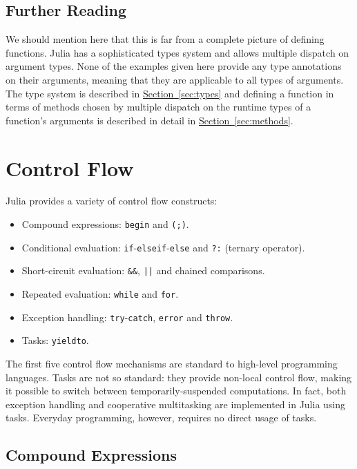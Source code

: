 \documentclass{article}
\renewcommand{\sec}[1]{\label{sec:#1}}
\newcommand{\Section}[1]{\hyperref[sec:#1]{Section~\ref*{sec:#1}}}
\begin{document}
\subsection{Further Reading}

We should mention here that this is far from a complete picture of defining functions.
Julia has a sophisticated types system and allows multiple dispatch on argument types.
None of the examples given here provide any type annotations on their arguments, meaning that they are applicable to all types of arguments.
The type system is described in \Section{types} and defining a function in terms of methods chosen by multiple dispatch on the runtime types of a function's arguments is described in detail in \Section{methods}.

\section{Control Flow}\sec{control-flow}

Julia provides a variety of control flow constructs:
\begin{itemize}
\item Compound expressions: \verb|begin| and \verb|(;)|.
\item Conditional evaluation: \verb|if|-\verb|elseif|-\verb|else| and \verb|?:| (ternary operator).
\item Short-circuit evaluation: \verb|&&|, \texttt{||} and chained comparisons.
\item Repeated evaluation: \verb|while| and \verb|for|.
\item Exception handling: \verb|try|-\verb|catch|, \verb|error| and \verb|throw|.
\item Tasks: \verb|yieldto|.
\end{itemize}
The first five control flow mechanisms are standard to high-level programming languages.
Tasks are not so standard:
they provide non-local control flow, making it possible to switch between
temporarily-suspended computations.
In fact, both exception handling and cooperative multitasking are implemented in Julia using tasks.
Everyday programming, however, requires no direct usage of tasks.

\subsection{Compound Expressions}\sec{compound-expressions}
\end{document}
